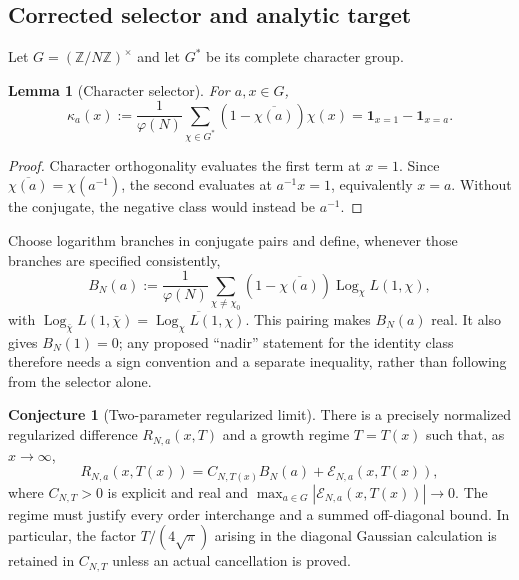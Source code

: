 \documentclass[12pt,reqno]{amsart}
\newtheorem{lemma}[theorem]{Lemma}
\theoremstyle{definition}
\newtheorem{conjecture}[theorem]{Conjecture}
\theoremstyle{remark}
\numberwithin{equation}{section}
\begin{document}
\subsection{Corrected selector and analytic target}

Let $G=(\mathbb Z/N\mathbb Z)^\times$ and let $G^*$ be its complete character
group.

\begin{lemma}[Character selector]\label{lem:selector}
For $a,x\in G$,
\begin{equation}\label{eq:selector}
 \kappa_a(x):=\frac1{\varphi(N)}\sum_{\chi\in G^*}
 (1-\overline{\chi(a)})\chi(x)
 =\mathbf 1_{x=1}-\mathbf 1_{x=a}.
\end{equation}
\end{lemma}

\begin{proof}
Character orthogonality evaluates the first term at $x=1$.  Since
$\overline{\chi(a)}=\chi(a^{-1})$, the second evaluates at $a^{-1}x=1$,
equivalently $x=a$.  Without the conjugate, the negative class would instead
be $a^{-1}$.
\end{proof}

Choose logarithm branches in conjugate pairs and define, whenever those
branches are specified consistently,
\begin{equation}\label{eq:BNa}
B_N(a):=\frac1{\varphi(N)}\sum_{\chi\ne\chi_0}
 (1-\overline{\chi(a)})\operatorname{Log}_{\chi}L(1,\chi),
\end{equation}
with
$\operatorname{Log}_{\bar\chi}L(1,\bar\chi)
=\overline{\operatorname{Log}_{\chi}L(1,\chi)}$.
This pairing makes $B_N(a)$ real.  It also gives $B_N(1)=0$; any proposed
``nadir'' statement for the identity class therefore needs a sign convention
and a separate inequality, rather than following from the selector alone.

\begin{conjecture}[Two-parameter regularized limit]\label{conj:regularized-target}
There is a precisely normalized regularized difference $R_{N,a}(x,T)$ and a
growth regime $T=T(x)$ such that, as $x\to\infty$,
\begin{equation}\label{eq:two-parameter-target}
 R_{N,a}(x,T(x))
 =C_{N,T(x)}B_N(a)+\mathcal E_{N,a}(x,T(x)),
\end{equation}
where $C_{N,T}>0$ is explicit and real and
$\max_{a\in G}|\mathcal E_{N,a}(x,T(x))|\to0$.
The regime must justify every order interchange and a summed off-diagonal
bound.  In particular, the factor $T/(4\sqrt\pi)$ arising in the diagonal
Gaussian calculation is retained in $C_{N,T}$ unless an actual cancellation
is proved.
\end{conjecture}
\end{document}
